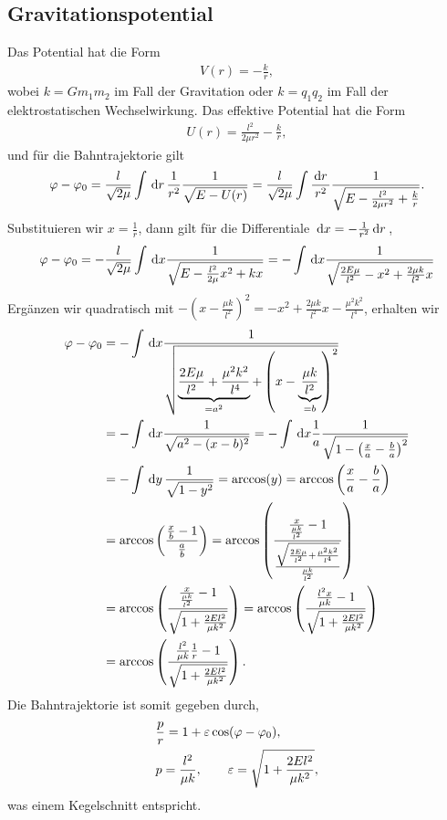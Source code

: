 \subsection{Gravitationspotential}

Das Potential hat die Form
\begin{align*}
V(r) = -\frac{k}{r},
\end{align*}
wobei $k= G m_1 m_2$ im Fall der Gravitation oder $k = q_1 q_2$ im Fall der
elektrostatischen Wechselwirkung. Das effektive Potential hat die Form
\begin{align*}
U(r) = \frac{l^2}{2\mu r^2} - \frac{k}{r},
\end{align*}
und für die Bahntrajektorie gilt
\begin{align*}
\varphi - \varphi_0 = \frac{l}{\sqrt{2\mu}}\int\,\mathrm{d} r\, \frac{1}{r^2}\frac{1}{\sqrt{E-U(r)}}
= \frac{l}{\sqrt{2\mu}}\int\frac{\,\mathrm{d} r\,}{r^2}\frac{1}{\sqrt{E-\frac{l^2}{2\mu r^2}
+ \frac{k}{r}}}.
\end{align*}
Substituieren wir $x = \frac{1}{r}$, dann gilt für die Differentiale $\,\mathrm{d} x =
-\frac{1}{r^2}\,\mathrm{d} r\,$,
\begin{align*}
\varphi - \varphi_0 = -\frac{l}{\sqrt{2\mu}}\int\,\mathrm{d} x \frac{1}{\sqrt{E-\frac{l^2}{2\mu}x^2 +
kx}}
= -\int\,\mathrm{d} x \frac{1}{\sqrt{\frac{2E\mu}{l^2}-x^2 +
\frac{2\mu k}{l^2}x}}
\end{align*}
Ergänzen wir quadratisch mit $-\left(x-\frac{\mu k}{l^2}\right)^2 = -x^2 +
\frac{2\mu k}{l^2}x - \frac{\mu^2 k^2}{l^4}$, erhalten wir
\begin{align*}
\varphi - \varphi_0 &= -\int\,\mathrm{d} x \frac{1}{\sqrt{\underbrace{\frac{2E\mu}{l^2} +
\frac{\mu^2 k^2}{l^4}}_{=a^2} +\left(x-\underbrace{\frac{\mu
k}{l^2}}_{=b}\right)^2}}\\ 
&= - \int\,\mathrm{d} x \frac{1}{\sqrt{a^2-(x-b)^2}}= - \int\,\mathrm{d} x \frac{1}{a}\frac{1}{\sqrt{1-\left(\frac{x}{a}-\frac{b}{a}\right)^2}}
\\ &= - \int\,\mathrm{d} y\, \frac{1}{\sqrt{1-y^2}}= \arccos(y) = \arccos\left(\frac{x}{a}-\frac{b}{a} \right)
\\ &= \arccos\left(\frac{\frac{x}{b} - 1}{\frac{a}{b}}\right)
= \arccos\left(\frac{\frac{x}{\frac{\mu k}{l^2}} -
1}{\frac{\sqrt{\frac{2E\mu}{l^2} + \frac{\mu^2 k^2}{l^4}}}{\frac{\mu
k}{l^2}}}\right)\\ 
&= \arccos\left(\frac{\frac{x}{\frac{\mu k}{l^2}} - 1}{\sqrt{1 +
\frac{2El^2}{\mu k^2}}}\right)
= \arccos\left(\frac{\frac{l^2x}{\mu k} - 1}{\sqrt{1+\frac{2El^2}{\mu
k^2}}}\right) \\ &=
\arccos\left(\frac{\frac{l^2}{\mu k}\frac{1}{r} -1}{\sqrt{1+\frac{2El^2}{\mu
k^2}}} \right).
\end{align*}
Die Bahntrajektorie ist somit gegeben durch,
\begin{align*}
&\frac{p}{r} = 1 + \varepsilon\cos(\varphi-\varphi_0),\\
&p = \frac{l^2}{\mu k},\qquad \varepsilon = \sqrt{1+\frac{2 E l^2}{\mu k^2}}, 
\end{align*}
was einem Kegelschnitt entspricht.

